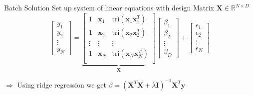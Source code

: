 \documentclass[navbarinfooter, 12pt]{sdqbeamer}
\begin{document}
\begin{frame}{Batch Solution}
  Set up system of linear equations with design Matrix
  $\mathbf{X} \in \mathbb{R}^{N \times D}$
  \begin{equation*}
    \begin{bmatrix} y_1 \\ y_2 \\ \vdots \\ y_N \end{bmatrix} =
    \underbrace{
      \begin{bmatrix}
        1 & \mathbf{x}_1 & \text{tri}(\mathbf{x}_1 \mathbf{x}_1^T) \\
        1 & \mathbf{x}_2 & \text{tri}(\mathbf{x}_2 \mathbf{x}_2^T) \\
        \vdots & \vdots & \vdots \\
        1 & \mathbf{x}_N & \text{tri}(\mathbf{x}_N \mathbf{x}_N^T) \\
      \end{bmatrix}}_{\mathbf{X}}
    \begin{bmatrix}
      \beta_1 \\ \beta_2 \\ \vdots \\ \beta_D
    \end{bmatrix}
    +
    \begin{bmatrix}
      \epsilon_1 \\
      \epsilon_2 \\
      \vdots \\
      \epsilon_N
    \end{bmatrix}
\end{equation*}

$\Rightarrow$ Using ridge regression we get $\beta = (\mathbf{X}^T \mathbf{X} +
\lambda \mathbf{I})^{-1} \mathbf{X}^T \mathbf{y} $
\end{frame}
\end{document}
